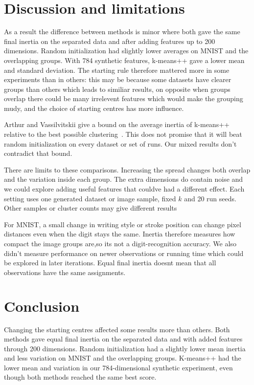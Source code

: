 \documentclass[11pt,a4paper]{article}
\begin{document}
\section{Discussion and limitations}

As a result the difference between methods is minor where both gave the same final inertia on the separated data and after adding features up to 200 dimensions. Random initialization had slightly lower averages on MNIST and the overlapping groups. With 784 synthetic features, k-means++ gave a lower mean and standard deviation. The starting rule therefore mattered more in some experiments than in others: this may be because some datasets have clearer groups than others which leads to similiar results, on opposite when groups overlap there could be many irrelevent features which would make the grouping mudy, and the choice of starting centres has more influence.

Arthur and Vassilvitskii give a bound on the average inertia of k-means++ relative to the best possible clustering~\cite{arthur2007}. This does not promise that it will beat random initialization on every dataset or set of runs. Our mixed results don't contradict that bound.

There are limits to these comparisons. Increasing the spread changes both overlap and the variation inside each group. The extra dimensions do contain noise and we could explore adding useful features that couldve had a different effect. Each setting uses one generated dataset or image sample, fixed $k$ and 20 run seeds. Other samples or cluster counts may give different results

For MNIST, a small change in writing style or stroke position can change pixel distances even when the digit stays the same. Inertia therefore measures how compact the image groups are,so its not a digit-recognition accuracy. We also didn't measure performance on newer observations or running time which could be explored in later iterations. Equal final inertia doesnt mean that all observations have the same assignments.

\section{Conclusion}

Changing the starting centres affected some results more than others. Both methods gave equal final inertia on the separated data and with added features through 200 dimensions. Random initialization had a slightly lower mean inertia and less variation on MNIST and the overlapping groups. K-means++ had the lower mean and variation in our 784-dimensional synthetic experiment, even though both methods reached the same best score.
\end{document}
